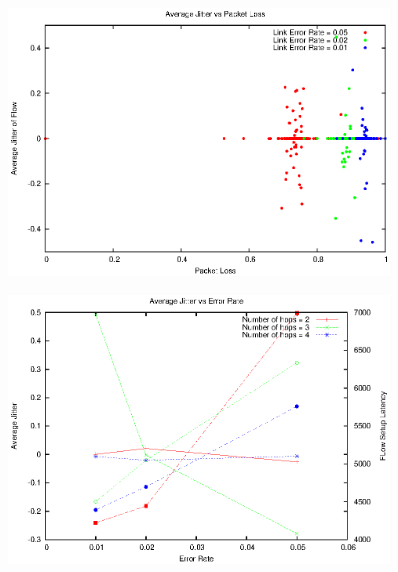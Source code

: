 \documentclass[a4]{article}
\begin{document}
\begin{figure}
\centering
\includegraphics[width=0.9\textwidth]{jitter-vs-loss.eps}
\end{figure}
\begin{figure}
\centering
\includegraphics[width=0.9\textwidth]{jitter-latency-vs-error.eps}
\end{figure}
\end{document}
